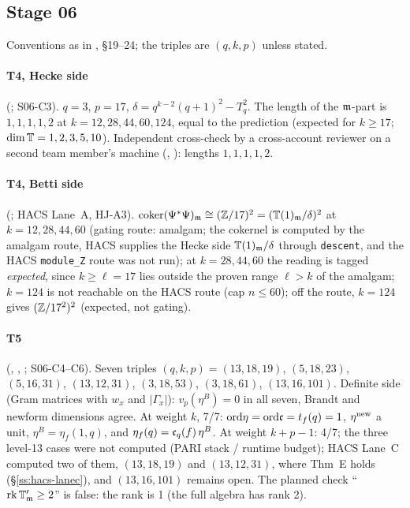\subsection{Stage 06}
Conventions as in \mainpdf, \S19--24; the triples are $(q,k,p)$ unless stated.

\paragraph{T4, Hecke side} (; S06-C3). $q=3$, $p=17$, $\delta=q^{k-2}(q+1)^2-T_q^2$. The length
of the $\mathfrak{m}$-part is $1,1,1,1,2$ at $k=12,28,44,60,124$, equal to the prediction (expected for $k\ge17$; $\dim\mathbb{T}=1,2,3,5,10$). Independent
cross-check by a cross-account reviewer on a second team member's machine (, ): lengths $1,1,1,1,2$.

\paragraph{T4, Betti side} (; HACS Lane~A, HJ-A3). $\operatorname{coker}(\Psi^*\Psi)_{\mathfrak{m}}\cong(\mathbb{Z}/17)^2=(\mathbb{T}(1)_{\mathfrak{m}}/\delta)^2$
at $k=12,28,44,60$ (gating route: amalgam; the cokernel is computed by the amalgam route, HACS supplies the Hecke side $\mathbb{T}(1)_{\mathfrak{m}}/\delta$
through \texttt{descent}, and the HACS \texttt{module\_Z} route was not run); at $k=28,44,60$ the reading is tagged \emph{expected}, since $k\ge\ell=17$ lies
outside the proven range $\ell>k$ of the amalgam; $k=124$ is not reachable on the HACS route (cap $n\le60$); off the route,
$k=124$ gives $(\mathbb{Z}/17^2)^2$ (expected, not gating).

\paragraph{T5} (, , ; S06-C4--C6). Seven triples
$(q,k,p)=(13,18,19)$, $(5,18,23)$, $(5,16,31)$, $(13,12,31)$, $(3,18,53)$, $(3,18,61)$, $(13,16,101)$. Definite side (Gram matrices with
$w_x$ and $|\Gamma_x|$): $v_p(\eta^B)=0$ in all seven, Brandt and newform dimensions agree. At weight $k$, 7/7: $\mathrm{ord}\eta=\mathrm{ord}\mathfrak{c}=t_f(q)=1$,
$\eta^{\rm new}$ a unit, $\eta^B=\eta_f(1,q)$, and $\eta_f(q)=\mathfrak{c}_q(f)\,\eta^B$. At weight $k+p-1$: 4/7; the three level-13
cases were not computed (PARI stack / runtime budget); HACS Lane~C computed two of them, $(13,18,19)$ and $(13,12,31)$, where Thm~E
holds (\S\ref{ss:hacs-lanec}), and $(13,16,101)$ remains open. The planned check ``$\operatorname{rk}\mathbb{T}'_{\mathfrak{m}}\ge2$'' is false: the rank is 1 (the full
algebra has rank 2).


